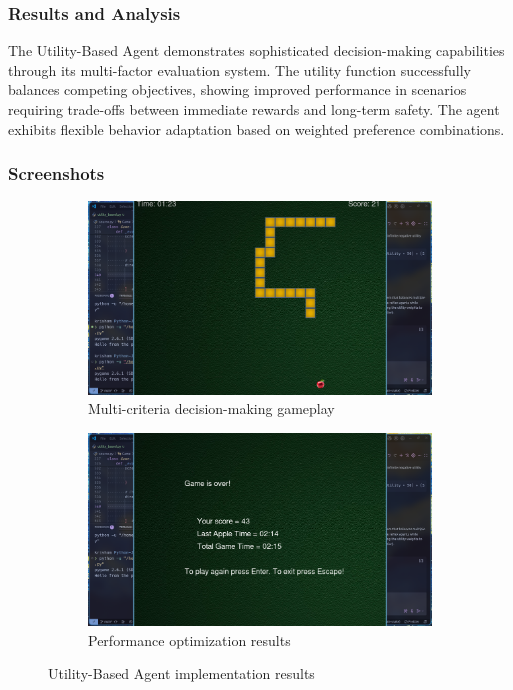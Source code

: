 \documentclass[11pt,a4paper]{article}
\begin{document}
\subsubsection{Results and Analysis}
The Utility-Based Agent demonstrates sophisticated decision-making capabilities through its multi-factor evaluation system. The utility function successfully balances competing objectives, showing improved performance in scenarios requiring trade-offs between immediate rewards and long-term safety. The agent exhibits flexible behavior adaptation based on weighted preference combinations.

\subsubsection{Screenshots}
\begin{figure}[H]
    \centering
    \begin{subfigure}{0.6\textwidth}
        \includegraphics[width=\textwidth]{ss/utility_based_play.png}
        \caption{Multi-criteria decision-making gameplay}
    \end{subfigure}
    \hfill
    \begin{subfigure}{0.6\textwidth}
        \includegraphics[width=\textwidth]{ss/utility_based_score.png}
        \caption{Performance optimization results}
    \end{subfigure}
    \caption{Utility-Based Agent implementation results}
\end{figure}
\end{document}
